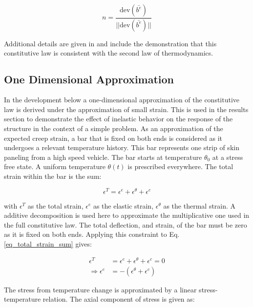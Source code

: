 \documentclass[conf]{new-aiaa}
\begin{document}
\begin{equation}
  n = \frac{\text{dev}( \bar{b^e}) }{ ||\text{dev}( \bar{b^e})||}
\end{equation}

\noindent
Additional details are given
in \cite{li_simulation_of_finite_strain_inelastic_phenomena_governed_by_creep_and_plasticity}
and include the demonstration that
this constitutive law is consistent with the second law of thermodynamics.

\subsection{One Dimensional Approximation}
In the development below a one-dimensional approximation of 
the constitutive law is derived under the approximation of small strain. 
This is used in the results section to demonstrate the 
effect of inelastic behavior on the response of the structure 
in the context of a simple problem.
As an approximation of the expected creep strain,
a bar that is fixed on both ends is considered as it 
undergoes a relevant temperature history.
This bar represents one strip of skin paneling from 
a high speed vehicle.
The bar starts at temperature $\theta_0$ at a stress free state. 
A uniform temperature $\theta(t)$ is prescribed everywhere.
The total strain within the bar is the sum:

\begin{equation}
\epsilon^T = \epsilon^e  + \epsilon^\theta + \epsilon^c
\label{eq_total_strain_sum}
\end{equation}

\noindent
with $\epsilon^T$ as the total strain,
$\epsilon^e$ as the elastic strain,
$\epsilon^\theta$ as the thermal strain.
A additive decomposition is used here to approximate the multiplicative one 
used in the full constitutive law.
The total deflection, and strain, of the bar must be zero as it 
is fixed on both ends.
Applying this constraint to Eq. \ref{eq_total_strain_sum} gives:

\begin{align}
\epsilon^T &= \epsilon^e + \epsilon^\theta + \epsilon^c = 0 \\
\Rightarrow
  \epsilon^e &= -\left( \epsilon^\theta + \epsilon^c \right)  \label{eq_strain_balance}
\end{align}

\noindent
The stress from temperature change is approximated by
a linear stress-temperature relation. 
The axial component of stress is given as:
\end{document}
